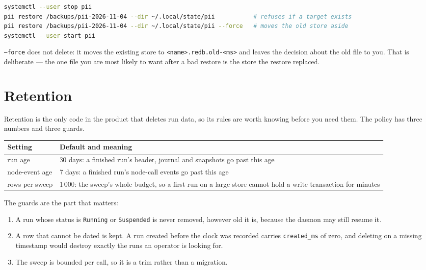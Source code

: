 \begin{lstlisting}[language=bash]
systemctl --user stop pii
pii restore /backups/pii-2026-11-04 --dir ~/.local/state/pii           # refuses if a target exists
pii restore /backups/pii-2026-11-04 --dir ~/.local/state/pii --force   # moves the old store aside
systemctl --user start pii
\end{lstlisting}

\texttt{--force} does not delete: it moves the existing store to
\texttt{\textless{}name\textgreater{}.redb.old-\textless{}ms\textgreater{}} and leaves the
decision about the old file to you. That is
deliberate --- the one file you are most likely to want after a bad restore is the store
the restore replaced.

\section{Retention}

Retention is the only code in the product that deletes run data, so its rules are worth
knowing before you need them. The policy has three numbers and three guards.

\begin{center}
\begin{tabular}{@{}p{}p{}@{}}
	\toprule
	\textbf{Setting} & \textbf{Default and meaning} \\
	\midrule
	run age & 30 days: a finished run's header, journal and snapshots go past this age \\
	node-event age & 7 days: a finished run's node-call events go past this age \\
	rows per sweep & 1\,000: the sweep's whole budget, so a first run on a large store
	cannot hold a write transaction for minutes \\
	\bottomrule
\end{tabular}
\end{center}

The guards are the part that matters:

\begin{enumerate}
	\item A run whose status is \texttt{Running} or \texttt{Suspended} is never removed,
	however old it is, because the daemon may still resume it.
	\item A row that cannot be dated is kept. A run created before the clock was recorded
	carries \texttt{created\_ms} of zero, and deleting on a missing timestamp would destroy
	exactly the runs an operator is looking for.
	\item The sweep is bounded per call, so it is a trim rather than a migration.
\end{enumerate}


